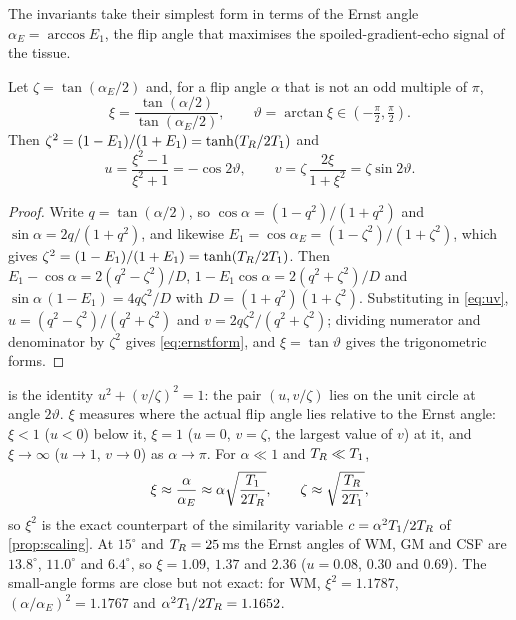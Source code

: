 The invariants take their simplest form in terms of the Ernst angle $\alpha_E=\arccos E_1$, the
flip angle that maximises the spoiled-gradient-echo signal of the tissue.

\begin{proposition}\label{prop:ernst}
Let $\zeta=\tan(\alpha_E/2)$ and, for a flip angle $\alpha$ that is not an odd multiple of $\pi$,
\begin{equation}
  \xi=\frac{\tan(\alpha/2)}{\tan(\alpha_E/2)},\qquad \vartheta=\arctan\xi\in(-\tfrac\pi2,\tfrac\pi2).
  \label{eq:xi}
\end{equation}
Then $\zeta^2=(1-E_1)/(1+E_1)=\tanh(T_R/2T_1)$ and
\begin{equation}
  u=\frac{\xi^2-1}{\xi^2+1}=-\cos2\vartheta,\qquad
  v=\zeta\,\frac{2\xi}{1+\xi^2}=\zeta\sin2\vartheta .
  \label{eq:ernstform}
\end{equation}
\end{proposition}
\begin{proof}
Write $q=\tan(\alpha/2)$, so $\cos\alpha=(1-q^2)/(1+q^2)$ and $\sin\alpha=2q/(1+q^2)$, and likewise
$E_1=\cos\alpha_E=(1-\zeta^2)/(1+\zeta^2)$, which gives $\zeta^2=(1-E_1)/(1+E_1)=\tanh(T_R/2T_1)$.
Then $E_1-\cos\alpha=2(q^2-\zeta^2)/D$, $1-E_1\cos\alpha=2(q^2+\zeta^2)/D$ and
$\sin\alpha\,(1-E_1)=4q\zeta^2/D$ with $D=(1+q^2)(1+\zeta^2)$. Substituting in \eqref{eq:uv},
$u=(q^2-\zeta^2)/(q^2+\zeta^2)$ and $v=2q\zeta^2/(q^2+\zeta^2)$; dividing numerator and denominator
by $\zeta^2$ gives \eqref{eq:ernstform}, and $\xi=\tan\vartheta$ gives the trigonometric forms.
\end{proof}

 is the identity $u^2+(v/\zeta)^2=1$: the pair $(u,v/\zeta)$ lies on the unit
circle at angle $2\vartheta$. $\xi$ measures where the actual flip angle lies relative to the
Ernst angle: $\xi<1$ ($u<0$) below it, $\xi=1$ ($u=0$, $v=\zeta$, the largest value of $v$) at
it, and $\xi\to\infty$ ($u\to1$, $v\to0$) as $\alpha\to\pi$. For $\alpha\ll1$ and $T_R\ll T_1$,
\begin{equation}
  \xi\approx\frac{\alpha}{\alpha_E}\approx\alpha\sqrt{\frac{T_1}{2T_R}},\qquad
  \zeta\approx\sqrt{\frac{T_R}{2T_1}} ,
  \label{eq:xismall}
\end{equation}
so $\xi^2$ is the exact counterpart of the similarity variable $c=\alpha^2T_1/2T_R$ of
\cref{prop:scaling}. At $15^\circ$ and $T_R=25$\,ms the Ernst angles of WM, GM and CSF are $13.8^\circ$,
$11.0^\circ$ and $6.4^\circ$, so $\xi=1.09$, $1.37$ and $2.36$ ($u=0.08$, $0.30$ and $0.69$). The
small-angle forms are close but not exact: for WM, $\xi^2=1.1787$, $(\alpha/\alpha_E)^2=1.1767$ and
$\alpha^2T_1/2T_R=1.1652$.

